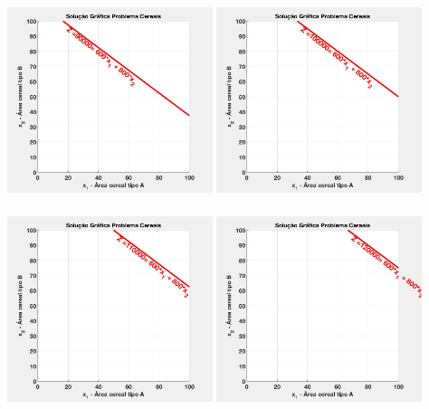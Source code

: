 \documentclass{beamer}
\begin{document}
\begin{frame}
\begin{columns}
\begin{column}{0.5\textwidth}
			\only<6> {\includegraphics[width=6cm,height=6cm]{MatLab/anima_6.png} }
			\only<7> {\includegraphics[width=6cm,height=6cm]{MatLab/anima_7.png} }
			\only<8> {\includegraphics[width=6cm,height=6cm]{MatLab/anima_8.png} }
			\only<9-10> {\includegraphics[width=6cm,height=6cm]{MatLab/anima_9.png} }

\end{column}
\end{columns}
\end{frame}
\end{document}
